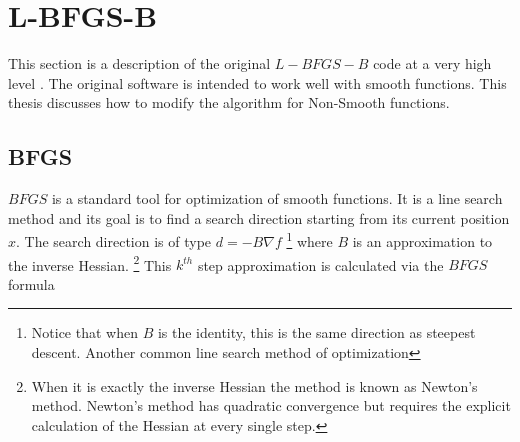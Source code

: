 



\chapter{L-BFGS-B}
\label{ChapterConstraints} %

This section is a description of the original $L-BFGS-B$ code at a very high level \citep{lbfgsbsoftware}. The original software is intended to work well with smooth functions. This thesis discusses how to modify the algorithm for Non-Smooth functions.

\section{BFGS}

$BFGS$ is a standard tool for optimization of smooth functions. It is a line search method and its goal is to find a search direction starting from its current position $x$. The search direction is of type $d = -B \nabla f$ \footnote{Notice that when $B$ is the identity, this is the same direction as steepest descent. Another common line search method of optimization} where $B$ is an approximation to the inverse Hessian. \footnote{When it is exactly the inverse Hessian the method is known as Newton's method. Newton's method has quadratic convergence but requires the explicit calculation of the Hessian at every single step.} This $k^{th}$ step approximation is calculated via the $BFGS$ formula

